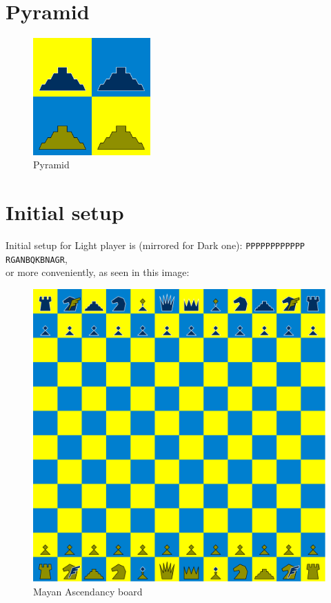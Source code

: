 \documentclass[a5paper,12pt,draft]{book} %
\begin{document}
\section*{Pyramid}

\noindent
\begin{figure}
\includegraphics[width=0.4\textwidth, keepaspectratio=true]{../gfx/pieces/08_pyramid.png}
\caption{Pyramid}
\label{fig:pyramid}
\end{figure}

\clearpage

\section*{Initial setup}

Initial setup for Light player is (mirrored for Dark one):
\texttt{PPPPPPPPPPPP \\
        RGANBQKBNAGR}, \\
or more conveniently, as seen in this image:

\noindent
\begin{figure}[h]
\includegraphics[width=1.0\textwidth, keepaspectratio=true]{../gfx/boards/06_mayan_ascendancy.png}
\caption{Mayan Ascendancy board}
\label{fig:mayan_ascendancy}
\end{figure}
\end{document}
